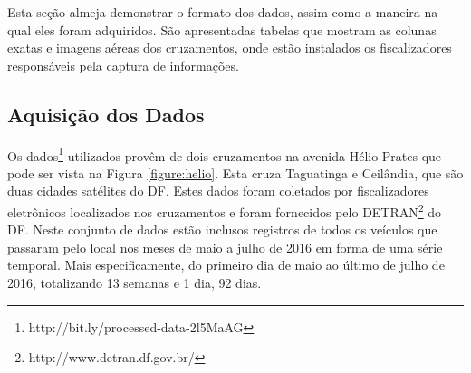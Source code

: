 Esta seção almeja demonstrar o formato dos dados, assim como a maneira na qual eles foram adquiridos. São apresentadas tabelas que mostram as colunas exatas e imagens aéreas dos cruzamentos, onde estão instalados os fiscalizadores responsáveis pela captura de informações.

\subsection{Aquisição dos Dados}

Os dados\footnote{http://bit.ly/processed-data-2l5MaAG} utilizados provêm de dois cruzamentos na avenida Hélio Prates que pode ser vista na Figura \ref{figure:helio}. Esta cruza Taguatinga e Ceilândia, que são duas cidades satélites do \acrshort{DF}. Estes dados foram coletados por fiscalizadores eletrônicos localizados nos cruzamentos e foram fornecidos pelo \acrshort{DETRAN}\footnote{http://www.detran.df.gov.br/} do \acrshort{DF}. Neste conjunto de dados estão inclusos registros de todos os veículos que passaram pelo local nos meses de maio a julho de 2016 em forma de uma série temporal. Mais especificamente, do primeiro dia de maio ao último de julho de 2016, totalizando 13 semanas e 1 dia, 92 dias.

